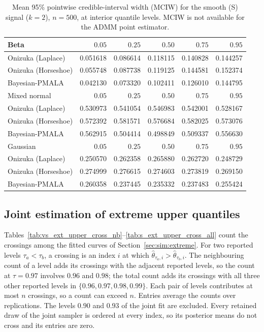 \begin{table}[!htbp]
\centering
\small
\caption{Mean 95\% pointwise credible-interval width (MCIW) for the smooth (S) signal ($k=2$), $n=500$, at interior quantile levels. MCIW is not available for the ADMM point estimator.}
\label{tab:s_int_mciw}
\begin{tabular}{lrrrrr}
\toprule
Beta & $0.05$ & $0.25$ & $0.50$ & $0.75$ & $0.95$ \\
\midrule
Onizuka (Laplace) & 0.051618 & 0.086614 & 0.118115 & 0.140828 & 0.144257 \\
Onizuka (Horseshoe) & 0.055748 & 0.087738 & 0.119125 & 0.144581 & 0.152374 \\
Bayesian-PMALA & 0.042130 & 0.073320 & 0.102411 & 0.126010 & 0.144795 \\
\midrule
Mixed normal & $0.05$ & $0.25$ & $0.50$ & $0.75$ & $0.95$ \\
\midrule
Onizuka (Laplace) & 0.530973 & 0.541054 & 0.546983 & 0.542001 & 0.528167 \\
Onizuka (Horseshoe) & 0.572392 & 0.581571 & 0.576684 & 0.582025 & 0.573076 \\
Bayesian-PMALA & 0.562915 & 0.504414 & 0.498849 & 0.509337 & 0.556630 \\
\midrule
Gaussian & $0.05$ & $0.25$ & $0.50$ & $0.75$ & $0.95$ \\
\midrule
Onizuka (Laplace) & 0.250570 & 0.262358 & 0.265880 & 0.262720 & 0.248729 \\
Onizuka (Horseshoe) & 0.274999 & 0.276615 & 0.274603 & 0.273819 & 0.269150 \\
Bayesian-PMALA & 0.260358 & 0.237445 & 0.235332 & 0.237483 & 0.255424 \\
\bottomrule
\end{tabular}
\end{table}


\clearpage
\subsection{Joint estimation of extreme upper quantiles}
\label{app:sim:joint_extreme}

Tables~\ref{tab:vs_ext_upper_cross_nb}--\ref{tab:s_ext_upper_cross_all} count the crossings among the fitted curves of Section~\ref{sec:sim:extreme}. For two reported levels $\tau_a<\tau_b$, a crossing is an index $i$ at which $\widehat{\theta}_{\tau_a,i}>\widehat{\theta}_{\tau_b,i}$. The neighbouring count of a level adds its crossings with the adjacent reported levels, so the count at $\tau=0.97$ involves $0.96$ and $0.98$; the total count adds its crossings with all three other reported levels in $\{0.96,0.97,0.98,0.99\}$. Each pair of levels contributes at most $n$ crossings, so a count can exceed $n$. Entries average the counts over replications. The levels $0.90$ and $0.93$ of the joint fit are excluded. Every retained draw of the joint sampler is ordered at every index, so its posterior means do not cross and its entries are zero.

